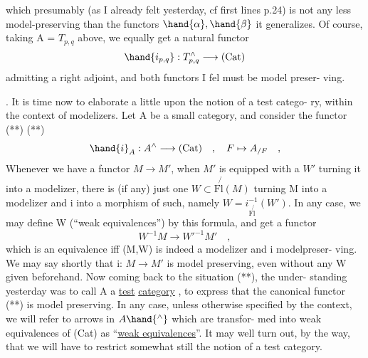 which presumably (as I already felt yesterday, cf first lines p.24) is not
any less model-preserving than the functors $\hand{\alpha},\hand{\beta}$ it generalizes.  Of course,
taking A = $T_{p,q}$ above,  we equally get a natural functor
\[ \hand{i_{p,q}} : T^{\wedge}_{p,q} \longrightarrow (\mathrm{Cat}) \]
\margin{$\uparrow$} admitting a right adjoint, and both functors I fel must be model preser-%
ving.

.  It is time now to elaborate a little upon the notion of a test catego-%
ry,  within the context of modelizers.  Let A be a small category,  and
consider  the functor (**)
\margin{$\downarrow$} (**) \[ \hand{i}_{A} : A^{\wedge} \longrightarrow (\mathrm{Cat}) \quad , \quad F \mapsto A_{/F} \quad , \]
Whenever we have a functor  $M \to M'$,  when $M'$ is equipped with a $W'$ turning
it into a modelizer,  there is (if any)  just one $W \subset \mathrm{F}\!\not{\mathrm{l}}(M)$ turning M into
a modelizer and i into a morphism of such,  namely $W = i_{\mathrm{F}\!\not{\mathrm{l}}}^{-1}(W')$.  In any
case,  we may define W (``weak equivalences'') by this formula,  and get a
functor
\[ W^{-1}M \longrightarrow W'^{-1}M' \quad , \]
which is an equivalence iff (M,W) is indeed a modelizer and i modelpreser-%
ving.  We may say shortly that i: $M \to M'$ is model preserving,  even without
any W given beforehand.  Now coming back to the situation  (**),  the under-%
standing yesterday was to call A a \uline{test} \uline{category} ,  to express that the
canonical functor (**) is model preserving. \hand{(}In any case,  unless otherwise
specified by the context, we will refer to arrows in $A\hand{^{\wedge}}$ which are transfor-%
med into weak equivalences of (Cat)  as ``\uline{weak equivalences}''.\hand{)} It may well
turn out,  by the way,  that we will have to restrict somewhat still the
notion of a test category.

